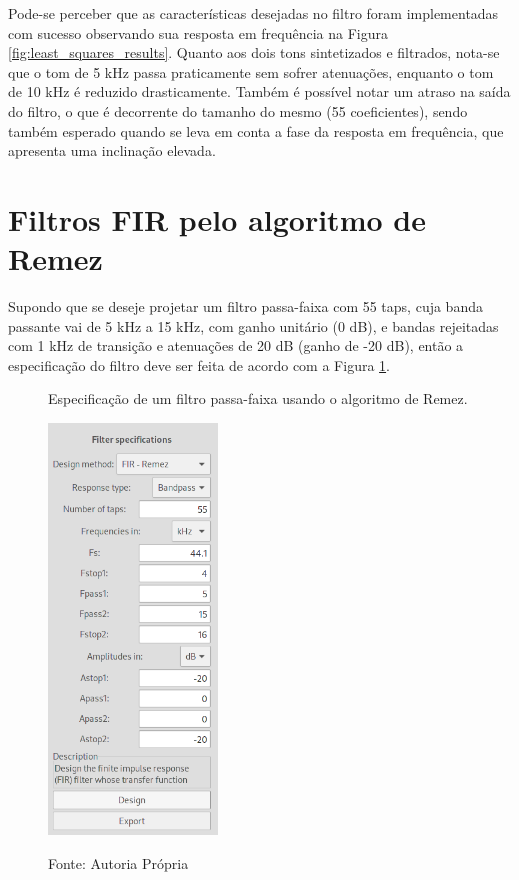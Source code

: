 \documentclass[12pt,a4paper]{report}
\begin{document}
  Pode-se perceber que as características desejadas no filtro foram implementadas com sucesso observando sua
  resposta em frequência na Figura \ref{fig:least_squares_results}. Quanto aos dois tons sintetizados e
  filtrados, nota-se que o tom de 5 kHz passa praticamente sem sofrer atenuações, enquanto o tom de 10 kHz é
  reduzido drasticamente. Também é possível notar um atraso na saída do filtro, o que é decorrente do tamanho do
  mesmo (55 coeficientes), sendo também esperado quando se leva em conta a fase da resposta em frequência, que
  apresenta uma inclinação elevada.

\section{Filtros FIR pelo algoritmo de Remez}
  Supondo que se deseje projetar um filtro passa-faixa com 55 taps, cuja banda passante vai de 5 kHz a 15 kHz,
  com ganho unitário (0 dB), e bandas rejeitadas com 1 kHz de transição e atenuações de 20 dB (ganho de -20 dB),
  então a especificação do filtro deve ser feita de acordo com a Figura \ref{fig:remez_specifications}.
  \begin{figure}[H]
    \caption{Especificação de um filtro passa-faixa usando o algoritmo de Remez.}
    \centering
    \includegraphics[width=0.4\textwidth]{images/remez_specifications}
    \label{fig:remez_specifications}
    \caption*{Fonte: Autoria Própria}
  \end{figure}
\end{document}
